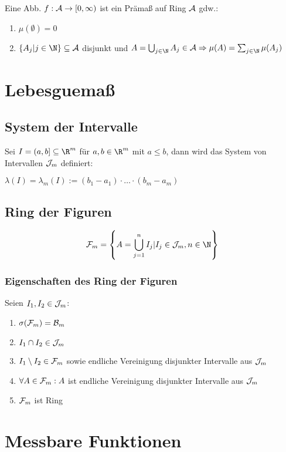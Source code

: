 Eine Abb. $f : \mathcal{A} \to [0, \infty)$ ist ein Prämaß auf Ring $\mathcal{A}$ gdw.:

\begin{enumerate}[label=(\alph*)]
	\item $\mu(\emptyset) = 0$
	\item $\{A_j | j \in \N\} \subseteq \A$ disjunkt und $A = \bigcup_{j\in \N} A_j \in \A \Rightarrow \mu(A) = \sum_{j\in \N} \mu(A_j)$
\end{enumerate}

\section*{Lebesguemaß}

\subsection*{System der Intervalle}

Sei $I = (a, b] \subseteq \R^m$ für $a, b \in \R^m$ mit $a \leq b$, dann wird das System von Intervallen $\mathcal{J}_m$ definiert:

$\lambda(I) = \lambda_m(I) := (b_1 - a_1) \cdot \hdots \cdot (b_m - a_m)$

\subsection*{Ring der Figuren}

$$\F_m = \left\{ A = \bigcup_{j=1}^n I_j | I_j \in \J_m, n \in \N \right\}$$

\subsubsection*{Eigenschaften des Ring der Figuren}

Seien $I_1, I_2 \in \mathcal{J}_m$:

\begin{enumerate}[label=(\alph*)]
	\item $\sigma(\mathcal{F}_m) = \mathcal{B}_m$
	\item $I_1 \cap I_2 \in \mathcal{J}_m$
	\item $I_1 \setminus I_2 \in \mathcal{F}_m$ sowie endliche Vereinigung disjunkter Intervalle aus $\mathcal{J}_m$
	\item $\forall A \in \mathcal{F}_m: A$ ist endliche Vereinigung disjunkter Intervalle aus $\mathcal{J}_m$
	\item $\mathcal{F}_m$ ist Ring
\end{enumerate}

\section*{Messbare Funktionen}

